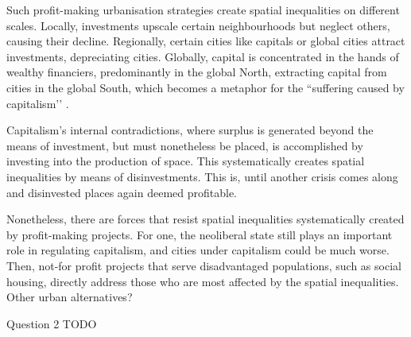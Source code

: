 \documentclass[12pt]{article}
\begin{document}
Such profit-making urbanisation strategies create spatial inequalities on different scales. Locally, investments upscale certain neighbourhoods but neglect others, causing their decline. Regionally, certain cities like capitals or global cities attract investments, depreciating cities. Globally, capital is concentrated in the hands of wealthy financiers, predominantly in the global North, extracting capital from cities in the global South, which becomes a metaphor for the ``suffering caused by capitalism’’ \parencite{de2015epistemologies}.

Capitalism’s internal contradictions, where surplus is generated beyond the means of investment, but must nonetheless be placed, is accomplished by investing into the production of space. This systematically creates spatial inequalities by means of disinvestments. This is, until another crisis comes along and disinvested places again deemed profitable.

Nonetheless, there are forces that resist spatial inequalities systematically created by profit-making projects. For one, the neoliberal state still plays an important role in regulating capitalism, and cities under capitalism could be much worse. Then, not-for profit projects that serve disadvantaged populations, such as social housing, directly address those who are most affected by the spatial inequalities. Other urban alternatives?


\pagebreak

Question 2 TODO

\printbibliography 
\end{document}
